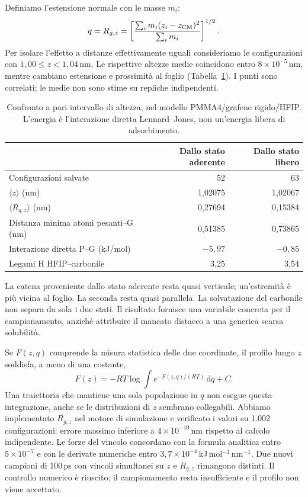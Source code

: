 \documentclass[11pt,reqno]{amsart}
\numberwithin{equation}{section}
\begin{document}
Definiamo l'estensione normale con le masse $m_i$:
\begin{equation}
 q=R_{g,z}=\left[\frac{\sum_i m_i(z_i-z_{\rm CM})^2}
 {\sum_i m_i}\right]^{1/2}.
\end{equation}
Per isolare l'effetto a distanze effettivamente uguali consideriamo
le configurazioni con $1{,}00\le z<1{,}04$\,nm.
Le rispettive altezze medie coincidono entro $8\times10^{-5}$\,nm,
mentre cambiano estensione e prossimit\`a al foglio
(Tabella~\ref{tab:orientation}). I punti sono correlati;
le medie non sono stime su repliche indipendenti.

\begin{table}[ht]
\centering\small
\caption{Confronto a pari intervallo di altezza, nel modello
PMMA4/grafene rigido/HFIP. L'energia \`e l'interazione diretta
Lennard--Jones, non un'energia libera di adsorbimento.}
\label{tab:orientation}
\begin{tabular}{lrr}
\toprule
 & Dallo stato aderente & Dallo stato libero\\
\midrule
Configurazioni salvate &52&63\\
$\langle z\rangle$ (nm)&1,02075&1,02067\\
$\langle R_{g,z}\rangle$ (nm)&0,27694&0,15384\\
Distanza minima atomi pesanti--G (nm)&0,51385&0,73865\\
Interazione diretta P--G (kJ/mol)&$-5,97$&$-0,85$\\
Legami H HFIP--carbonile&3,25&3,54\\
\bottomrule
\end{tabular}
\end{table}

La catena proveniente dallo stato aderente resta quasi verticale;
un'estremit\`a \`e pi\`u vicina al foglio. La seconda resta
quasi parallela. La solvatazione del carbonile non separa da sola
i due stati. Il risultato fornisce una variabile concreta per il
campionamento, anzich\'e attribuire il mancato distacco a una
generica scarsa solubilit\`a.

Se $F(z,q)$ comprende la misura statistica delle due coordinate,
il profilo lungo $z$ soddisfa, a meno di una costante,
\begin{equation}
 F(z)=-RT\log\!\int e^{-F(z,q)/(RT)}\,\mathrm dq+C.
\end{equation}
Una traiettoria che mantiene una sola popolazione in $q$ non
esegue questa integrazione, anche se le distribuzioni di $z$
sembrano collegabili. Abbiamo implementato $R_{g,z}$ nel motore
di simulazione e verificato i valori su 1.002 configurazioni:
errore massimo inferiore a $4\times10^{-10}$\,nm rispetto al
calcolo indipendente. Le forze del vincolo concordano con la
formula analitica entro $5\times10^{-7}$ e con le derivate
numeriche entro $3{,}7\times10^{-4}$\,kJ\,mol$^{-1}$\,nm$^{-1}$.
Due nuovi campioni di 100\,ps con vincoli simultanei su $z$ e
$R_{g,z}$ rimangono distinti. Il controllo numerico \`e riuscito;
il campionamento resta insufficiente e il profilo non viene accettato.
\end{document}
